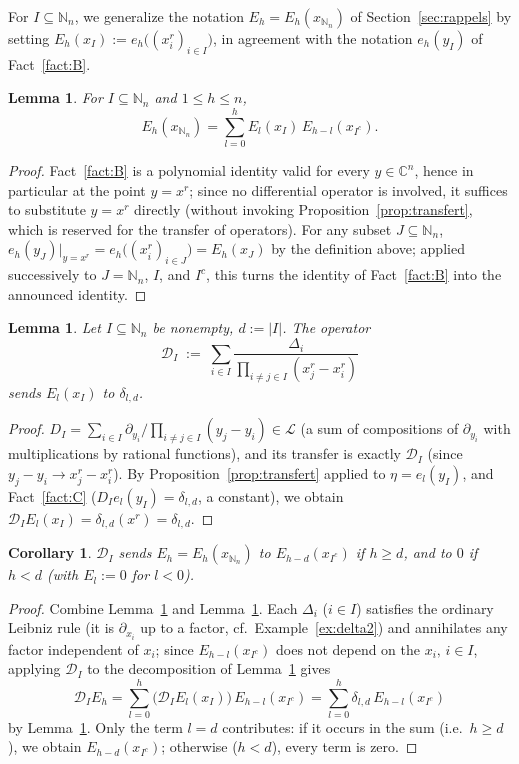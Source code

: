 \documentclass[11pt]{article}
\newtheorem{lemma}[theorem]{Lemma}
\newtheorem{corollary}[theorem]{Corollary}
\theoremstyle{remark}
\newcommand{\NN}{\mathbb{N}}
\newcommand{\CC}{\mathbb{C}}
\begin{document}
For $I\subseteq\NN_n$, we generalize the notation $E_h=E_h(x_{\NN_n})$ of Section~\ref{sec:rappels} by setting $E_h(x_I):=e_h\big((x_i^r)_{i\in I}\big)$, in agreement with the notation $e_h(y_I)$ of Fact~\ref{fact:B}.

\begin{lemma}\label{lem:lem2}
For $I\subseteq\NN_n$ and $1\le h\le n$,
\[
E_h(x_{\NN_n}) = \sum_{l=0}^h E_l(x_I)\,E_{h-l}(x_{I^c}).
\]
\end{lemma}

\begin{proof}
Fact~\ref{fact:B} is a polynomial identity valid for every $y\in\CC^n$, hence in particular at the point $y=x^r$; since no differential operator is involved, it suffices to substitute $y=x^r$ directly (without invoking Proposition~\ref{prop:transfert}, which is reserved for the transfer of operators). For any subset $J\subseteq\NN_n$, $e_h(y_J)|_{y=x^r}=e_h\big((x_i^r)_{i\in J}\big)=E_h(x_J)$ by the definition above; applied successively to $J=\NN_n$, $I$, and $I^c$, this turns the identity of Fact~\ref{fact:B} into the announced identity.
\end{proof}

\begin{lemma}\label{lem:lem3}
Let $I\subseteq\NN_n$ be nonempty, $d:=|I|$. The operator
\[
\mathcal D_I \;:=\; \sum_{i\in I} \frac{\Delta_i}{\displaystyle\prod_{i\neq j\in I}(x_j^r-x_i^r)}
\]
sends $E_l(x_I)$ to $\delta_{l,d}$.
\end{lemma}

\begin{proof}
$D_I=\sum_{i\in I}\partial_{y_i}/\prod_{i\ne j\in I}(y_j-y_i)\in\mathcal L$ (a sum of compositions of $\partial_{y_i}$ with multiplications by rational functions), and its transfer is exactly $\mathcal D_I$ (since $y_j-y_i\to x_j^r-x_i^r$). By Proposition~\ref{prop:transfert} applied to $\eta=e_l(y_I)$, and Fact~\ref{fact:C} ($D_Ie_l(y_I)=\delta_{l,d}$, a constant), we obtain $\mathcal D_I E_l(x_I) = \delta_{l,d}(x^r)=\delta_{l,d}$.
\end{proof}

\begin{corollary}\label{cor:cor4}
$\mathcal D_I$ sends $E_h=E_h(x_{\NN_n})$ to $E_{h-d}(x_{I^c})$ if $h\ge d$, and to $0$ if $h<d$ (with $E_l:=0$ for $l<0$).
\end{corollary}

\begin{proof}
Combine Lemma~\ref{lem:lem2} and Lemma~\ref{lem:lem3}. Each $\Delta_i$ ($i\in I$) satisfies the ordinary Leibniz rule (it is $\partial_{x_i}$ up to a factor, cf.\ Example~\ref{ex:delta2}) and annihilates any factor independent of $x_i$; since $E_{h-l}(x_{I^c})$ does not depend on the $x_i,\,i\in I$, applying $\mathcal D_I$ to the decomposition of Lemma~\ref{lem:lem2} gives
\[
\mathcal D_I E_h = \sum_{l=0}^h \big(\mathcal D_I E_l(x_I)\big)\,E_{h-l}(x_{I^c}) = \sum_{l=0}^h \delta_{l,d}\,E_{h-l}(x_{I^c})
\]
by Lemma~\ref{lem:lem3}. Only the term $l=d$ contributes: if it occurs in the sum (i.e.\ $h\ge d$), we obtain $E_{h-d}(x_{I^c})$; otherwise ($h<d$), every term is zero.
\end{proof}
\end{document}
